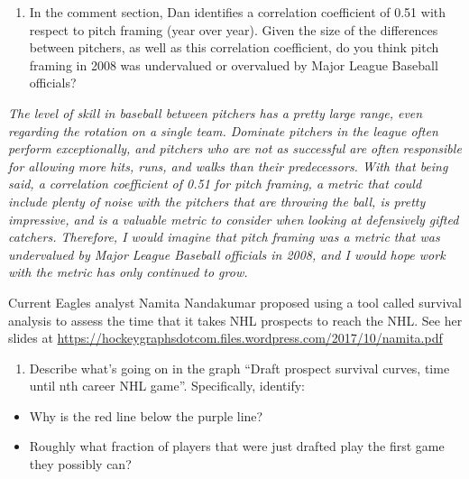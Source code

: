 \documentclass[]{article}
\providecommand{\tightlist}{%
  \setlength{\itemsep}{0pt}\setlength{\parskip}{0pt}}
\begin{document}
\begin{enumerate}
\def\labelenumi{\arabic{enumi}.}
\setcounter{enumi}{1}
\tightlist
\item
  In the comment section, Dan identifies a correlation coefficient of
  0.51 with respect to pitch framing (year over year). Given the size of
  the differences between pitchers, as well as this correlation
  coefficient, do you think pitch framing in 2008 was undervalued or
  overvalued by Major League Baseball officials?
\end{enumerate}

\emph{The level of skill in baseball between pitchers has a pretty large
range, even regarding the rotation on a single team. Dominate pitchers
in the league often perform exceptionally, and pitchers who are not as
successful are often responsible for allowing more hits, runs, and walks
than their predecessors. With that being said, a correlation coefficient
of 0.51 for pitch framing, a metric that could include plenty of noise
with the pitchers that are throwing the ball, is pretty impressive, and
is a valuable metric to consider when looking at defensively gifted
catchers. Therefore, I would imagine that pitch framing was a metric
that was undervalued by Major League Baseball officials in 2008, and I
would hope work with the metric has only continued to grow.}

Current Eagles analyst Namita Nandakumar proposed using a tool called
survival analysis to assess the time that it takes NHL prospects to
reach the NHL. See her slides at
\url{https://hockeygraphsdotcom.files.wordpress.com/2017/10/namita.pdf}

\begin{enumerate}
\def\labelenumi{\arabic{enumi}.}
\setcounter{enumi}{2}
\tightlist
\item
  Describe what's going on in the graph ``Draft prospect survival
  curves, time until nth career NHL game''. Specifically, identify:
\end{enumerate}

\begin{itemize}
\tightlist
\item
  Why is the red line below the purple line?
\item
  Roughly what fraction of players that were just drafted play the first
  game they possibly can?
\end{itemize}
\end{document}

